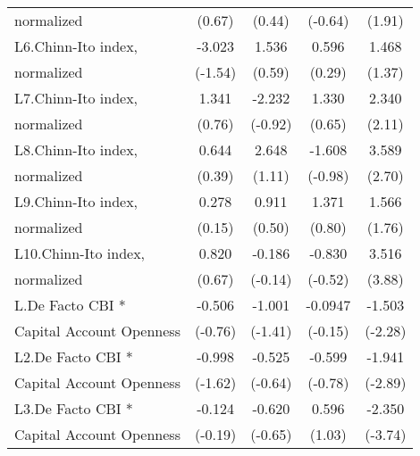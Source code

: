 {\begin{tabular}{l*{4}{c}}
normalized          &      (0.67)         &      (0.44)         &     (-0.64)         &      (1.91)         \\
[1em]
L6.Chinn-Ito index, &      -3.023         &       1.536         &       0.596         &       1.468         \\
normalized          &     (-1.54)         &      (0.59)         &      (0.29)         &      (1.37)         \\
[1em]
L7.Chinn-Ito index, &       1.341         &      -2.232         &       1.330         &       2.340\sym{*}  \\
normalized          &      (0.76)         &     (-0.92)         &      (0.65)         &      (2.11)         \\
[1em]
L8.Chinn-Ito index, &       0.644         &       2.648         &      -1.608         &       3.589\sym{**} \\
normalized          &      (0.39)         &      (1.11)         &     (-0.98)         &      (2.70)         \\
[1em]
L9.Chinn-Ito index, &       0.278         &       0.911         &       1.371         &       1.566         \\
normalized          &      (0.15)         &      (0.50)         &      (0.80)         &      (1.76)         \\
[1em]
L10.Chinn-Ito index,&       0.820         &      -0.186         &      -0.830         &       3.516\sym{***}\\
normalized          &      (0.67)         &     (-0.14)         &     (-0.52)         &      (3.88)         \\
[1em]
L.De Facto CBI *    &      -0.506         &      -1.001         &     -0.0947         &      -1.503\sym{*}  \\
Capital Account Openness&     (-0.76)         &     (-1.41)         &     (-0.15)         &     (-2.28)         \\
[1em]
L2.De Facto CBI *   &      -0.998         &      -0.525         &      -0.599         &      -1.941\sym{**} \\
Capital Account Openness&     (-1.62)         &     (-0.64)         &     (-0.78)         &     (-2.89)         \\
[1em]
L3.De Facto CBI *   &      -0.124         &      -0.620         &       0.596         &      -2.350\sym{***}\\
Capital Account Openness&     (-0.19)         &     (-0.65)         &      (1.03)         &     (-3.74)         \\

\end{tabular}}
